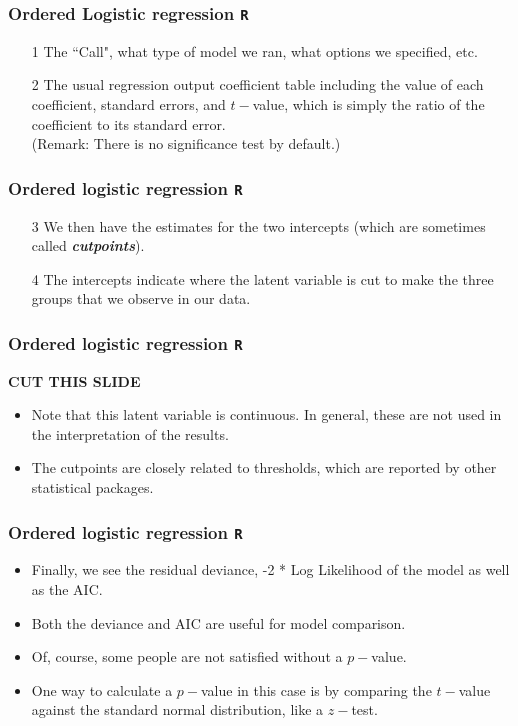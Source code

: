 \documentclass[00-GLMregslides.tex]{subfiles}
\begin{document}
\begin{frame}[fragile]
	\frametitle{Ordered Logistic regression \texttt{R} }
	\Large
\begin{itemize}
\item[1] The ``Call", what type of model we ran, what options we specified, etc.
\item[2] The usual regression output coefficient table including the value of each coefficient, standard errors, and 
$t-$value, which is simply the ratio of the coefficient to its standard error.\\ (Remark: There is no significance test by default.)
\end{itemize}
\end{frame}
\begin{frame}[fragile]
	\frametitle{Ordered logistic regression \texttt{R} }
	\Large
\begin{itemize}
\item[3]	
We then have the estimates for the two intercepts (which are sometimes called \textbf{\textit{cutpoints}}). 
\item[4] The intercepts indicate where the latent variable is cut to make the three groups that we observe in our data. 
\end{itemize}
\end{frame}
\begin{frame}[fragile]
	\frametitle{Ordered logistic regression \texttt{R} }
	\Large
	\textbf{CUT THIS SLIDE}
\begin{itemize}
\item Note that this latent variable is continuous. In general, these are not used in the interpretation of the results. \item  The cutpoints are closely related to thresholds, which are reported by other statistical packages.
\end{itemize}
\end{frame}
\begin{frame}[fragile]
	\frametitle{Ordered logistic regression \texttt{R} }
	\Large
\begin{itemize}
\item Finally, we see the residual deviance, -2 * Log Likelihood of the model as well as the AIC. 
\item Both the deviance and AIC are useful for model comparison.
\item Of, course, some people are not satisfied without a $p-$value.
\item One way to calculate a $p-$value in this case is by comparing the $t-$value against the standard normal distribution, like a $z-$test. 
\end{itemize}
\end{frame}
\end{document}

